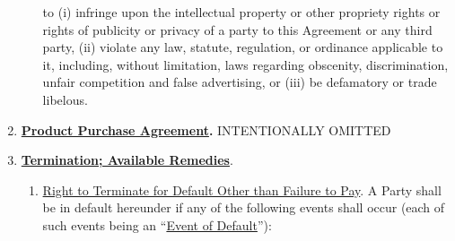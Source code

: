 \documentclass[]{article}
\begin{document}
\begin{enumerate}
\begin{enumerate}
    to (i) infringe upon the intellectual property or other propriety
    rights or rights of publicity or privacy of a party to this
    Agreement or any third party, (ii) violate any law, statute,
    regulation, or ordinance applicable to it, including, without
    limitation, laws regarding obscenity, discrimination, unfair
    competition and false advertising, or (iii) be defamatory or trade
    libelous.
  \end{enumerate}
\item
  \textbf{\uline{Product Purchase Agreement}.} INTENTIONALLY OMITTED
\item
  \textbf{\uline{Termination; Available Remedies}}.

  \begin{enumerate}
  \def\labelenumii{\arabic{enumii}.}
  \item
    \uline{Right to Terminate for Default Other than Failure to Pay}. A
    Party shall be in default hereunder if any of the following events
    shall occur (each of such events being an ``\uline{Event of
    Default}''):


\end{enumerate}
\end{enumerate}
\end{document}
